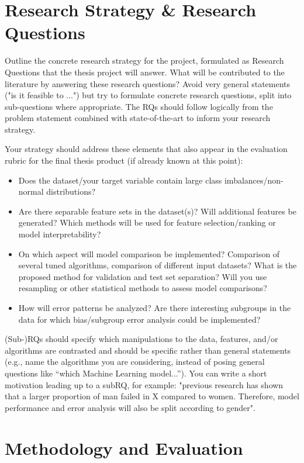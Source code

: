 \documentclass[11pt, a4paper]{article}
\begin{document}
\section{Research Strategy \& Research Questions}
Outline the concrete research strategy for the project, formulated as Research Questions that the thesis project will answer. What will be contributed to the literature by answering these research questions? Avoid very general statements ("is it feasible to ...") but try to formulate concrete research questions, split into sub-questions where appropriate. The RQs should follow logically from the problem statement combined with state-of-the-art to inform your research strategy.

Your strategy should address these elements that also appear in the evaluation rubric for the final thesis product (if already known at this point):
\begin{itemize}
    \item Does the dataset/your target variable contain large class imbalances/non-normal distributions?
    \item Are there separable feature sets in the dataset(s)? Will additional features be generated? Which methods will be used for feature selection/ranking or model interpretability?
    \item On which aspect will model comparison be implemented? Comparison of several tuned algorithms, comparison of different input datasets? What is the proposed method for validation and test set separation? Will you use resampling or other statistical methods to assess model comparisons?
    \item How will error patterns be analyzed? Are there interesting subgroups in the data for which bias/subgroup error analysis could be implemented?
\end{itemize}

(Sub-)RQs should specify which manipulations to the data, features, and/or algorithms are contrasted and should be specific rather than general statements (e.g., name the algorithms you are considering, instead of posing general questions like ``which Machine Learning model...''). You can write a short motivation leading up to a subRQ, for example: "previous research has shown that a larger proportion of man failed in X compared to women. Therefore, model performance and error analysis will also be split according to gender".

\section{Methodology and Evaluation}
\end{document}
